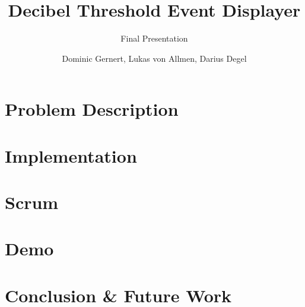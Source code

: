 \documentclass[authorontitle=true]{bfhbeamer}
\title{Decibel Threshold Event Displayer}
\subtitle{Final Presentation}
\author{Dominic Gernert, Lukas von Allmen, Darius Degel}
\begin{document}
\maketitle

\section{Problem Description}\label{sec:problem-description}

\section{Implementation}\label{sec:implementation}

\section{Scrum}\label{sec:scrum}

\section{Demo}\label{sec:demo}

\section{Conclusion \& Future Work}\label{sec:conclusion}

\end{document}
